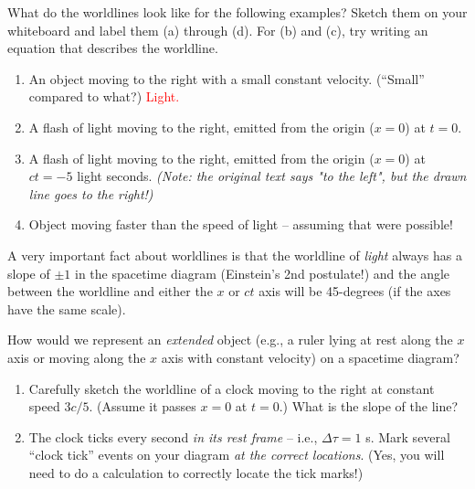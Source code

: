\documentclass[11pt, letterpaper, openany]{book}
\newenvironment{exercise}[1][Exercise]{%
  \tcolorbox[blanker, breakable, left=1em,
    before skip=1em, after skip=1em,
    borderline west={3pt}{0pt}{PhysNavy},
    colback=PhysCream,
    before upper={\textcolor{PhysNavy}{\sffamily\bfseries #1:}\space}
  ]%
}{%
  \endtcolorbox%
}
\begin{document}
\begin{exercise}[Exercise 3]
What do the worldlines look like for the following examples? Sketch them on your whiteboard and label them (a) through (d). For (b) and (c), try writing an equation that describes the worldline.
\begin{enumerate}[label=(\alph*)]
    \item An object moving to the right with a small constant velocity. (``Small'' compared to what?) \textcolor{red}{Light.}
    \item A flash of light moving to the right, emitted from the origin ($x=0$) at $t=0$.
    \item A flash of light moving to the right, emitted from the origin ($x=0$) at $ct = -5$ light seconds. \textit{(Note: the original text says "to the left", but the drawn line goes to the right!)}
    \item Object moving faster than the speed of light -- assuming that were possible!
\end{enumerate}
\end{exercise}

A very important fact about worldlines is that the worldline of \textit{light} always has a slope of $\pm 1$ in the spacetime diagram (Einstein's 2nd postulate!) and the angle between the worldline and either the $x$ or $ct$ axis will be 45-degrees (if the axes have the same scale).

\begin{exercise}[Quick Question]
How would we represent an \textit{extended} object (e.g., a ruler lying at rest along the $x$ axis or moving along the $x$ axis with constant velocity) on a spacetime diagram?
\end{exercise}

\begin{exercise}[Exercise 4]
\begin{enumerate}[label=(\alph*)]
    \item Carefully sketch the worldline of a clock moving to the right at constant speed $3c/5$. (Assume it passes $x=0$ at $t=0$.) What is the slope of the line?
    \item The clock ticks every second \textit{in its rest frame} -- i.e., $\Delta \tau = 1$ s. Mark several ``clock tick'' events on your diagram \textit{at the correct locations}. (Yes, you will need to do a calculation to correctly locate the tick marks!)
\end{enumerate}
\end{exercise}
\end{document}

